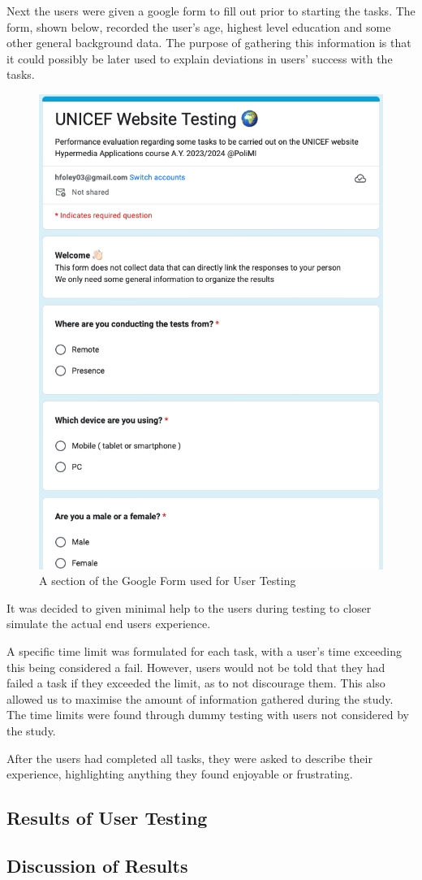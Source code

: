 Next the users were given a google form to fill out prior to starting the tasks. The form, shown below, recorded the user’s age, highest level education and some other general background data. The purpose of gathering this information is that it could possibly be later used to explain deviations in users’ success with the tasks.
\begin{figure}[h]
    \centering
    \includegraphics[scale=0.5]{Resources/Harry/GoogleForm.png}
    \caption{A section of the Google Form used for User Testing}
\end{figure}
It was decided to given minimal help to the users during testing to closer simulate the actual end users experience.

A specific time limit was formulated for each task, with a user’s time exceeding this being considered a fail. However, users would not be told that they had failed a task if they exceeded the limit, as to not discourage them. This also allowed us to maximise the amount of information gathered during the study. The time limits were found through dummy testing with users not considered by the study. 

After the users had completed all tasks, they were asked to describe their experience, highlighting anything they found enjoyable or frustrating. 

\subsection{Results of User Testing}

\subsection{Discussion of Results}

